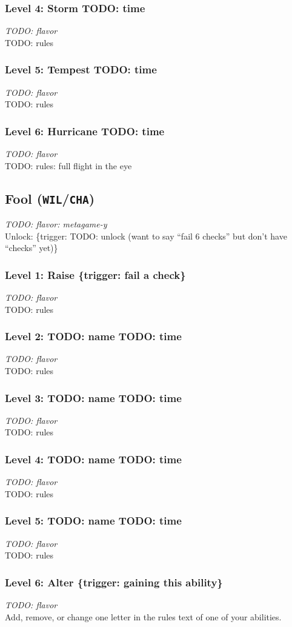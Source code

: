 \documentclass[12pt]{article}
\newcommand{\WIL}{\texttt{WIL}}
\newcommand{\CHA}{\texttt{CHA}}
\newcommand{\TRIG}[1]{\{trigger: #1\}}
\newcommand{\Class}[4]{\pagebreak\subsection{#1 (#2)}\label{#1}\textit{#3}\\[1mm]Unlock: \TRIG{#4}}
\newcommand{\Skill}[5]{\subsubsection{Level #1: #2 #3}\textit{#4}\\[1mm]#5}
\begin{document}
\Skill{4}{Storm}{TODO: time}
{TODO: flavor}
{TODO: rules}

\Skill{5}{Tempest}{TODO: time}
{TODO: flavor}
{TODO: rules}

\Skill{6}{Hurricane}{TODO: time}
{TODO: flavor}
{TODO: rules: full flight in the eye}

%

\Class{Fool}{\WIL/\CHA}
{TODO: flavor: metagame-y}
{TODO: unlock (want to say ``fail 6 checks'' but don't have ``checks'' yet)}

\Skill{1}{Raise}{\TRIG{fail a check}}
{TODO: flavor}
{TODO: rules}

\Skill{2}{TODO: name}{TODO: time}
{TODO: flavor}
{TODO: rules}

\Skill{3}{TODO: name}{TODO: time}
{TODO: flavor}
{TODO: rules}

\Skill{4}{TODO: name}{TODO: time}
{TODO: flavor}
{TODO: rules}

\Skill{5}{TODO: name}{TODO: time}
{TODO: flavor}
{TODO: rules}

\Skill{6}{Alter}{\TRIG{gaining this ability}}
{TODO: flavor}
{Add, remove, or change one letter in the rules text of one of your abilities.}
\end{document}
